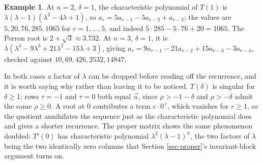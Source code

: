 \documentclass[11pt, a4paper, abstract=yes]{scrartcl}
\theoremstyle{definition}
\newtheorem{mexample}[definition]{Example}
\theoremstyle{remark}
\theoremstyle{plain}
\begin{document}
\begin{mexample}
At \(n=2\), \(\delta=1\), the characteristic polynomial of \(T(1)\) is
\(\lambda(\lambda-1)(\lambda^2-4\lambda+1)\), so \(a_r=5a_{r-1}-5a_{r-2}+a_{r-3}\); the values are
\(5,20,76,285,1065\) for \(r=1,\dots,5\), and indeed \(5\cdot285-5\cdot76+20=1065\). The Perron root
is \(2+\sqrt3\approx3.732\). At \(n=3\), \(\delta=1\), it is
\(\lambda(\lambda^4-9\lambda^3+21\lambda^2-15\lambda+3)\), giving
\(a_r=9a_{r-1}-21a_{r-2}+15a_{r-3}-3a_{r-4}\), checked against \(10,69,426,2532,14847\).

In both cases a factor of \(\lambda\) can be dropped before reading off the recurrence, and it is
worth saying why rather than leaving it to be noticed. \(T(\delta)\) is singular for
\(\delta\ge1\): rows \(\tau=-1\) and \(\tau=0\) both equal \(\vec u\), since
\(\rho>-1-\delta\) and \(\rho>-\delta\) admit the same \(\rho\ge0\). A root at \(0\)
contributes a term \(c\cdot0^{\,r}\), which vanishes for \(r\ge1\), so the quotient annihilates
the sequence just as the characteristic polynomial does and gives a shorter recurrence. The proper
matrix shows the same phenomenon doubled: \(T'(0)\) has characteristic polynomial
\(\lambda^2(\lambda-1)^n\), the two factors of \(\lambda\) being the two identically zero
columns that Section \ref{sec-proper}'s invariant-block argument turns on.


\end{mexample}
\end{document}
